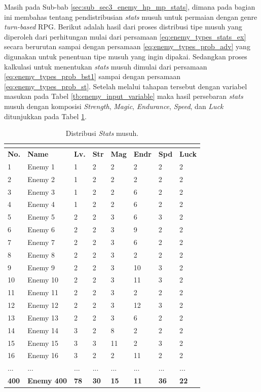 Masih pada Sub-bab \ref{sec:sub_sec3_enemy_hp_mp_stats}, dimana pada bagian ini membahas tentang pendistribusian \textit{stats} musuh untuk permaian dengan genre \textit{turn-based} RPG. Berikut adalah hasil dari proses distribusi tipe musuh yang diperoleh dari perhitungan mulai dari persamaan \ref{eq:enemy_types_stats_ex} secara berurutan sampai dengan persamaan \ref{eq:enemy_types_prob_adv} yang digunakan untuk penentuan tipe musuh yang ingin dipakai. Sedangkan proses kalkulasi untuk menentukan \textit{stats} musuh dimulai dari persamaan \ref{eq:enemy_types_prob_bst1} sampai dengan persamaan \ref{eq:enemy_types_prob_st}. Setelah melalui tahapan tersebut dengan variabel masukan pada Tabel \ref{tb:enemy_input_variable} maka hasil persebaran \textit{stats} musuh dengan komposisi \textit{Strength}, \textit{Magic}, \textit{Endurance}, \textit{Speed}, dan \textit{Luck} ditunjukkan pada Tabel \ref{tb:enemy_stats}.
\vspace{-1ex}

\begin{longtable}{|l|l|l|l|l|l|l|l|}
	\caption{Distribusi \textit{Stats} musuh.}
	\vspace{1ex}
	\label{tb:enemy_stats}\\
	\hline
	\rowcolor[HTML]{C0C0C0} 
	\textbf{No.} & \textbf{Name} & \textbf{Lv.} & \textbf{Str} & \textbf{Mag} & \textbf{Endr} & \textbf{Spd} & \textbf{Luck} \\ \hline
	1 & Enemy 1 & 1 & 2 & 2 & 2 & 2 & 2 \\ \hline
	2 & Enemy 2 & 1 & 2 & 2 & 2 & 2 & 2 \\ \hline
	3 & Enemy 3 & 1 & 2 & 2 & 6 & 2 & 2 \\ \hline
	4 & Enemy 4 & 1 & 2 & 2 & 6 & 2 & 2 \\ \hline
	5 & Enemy 5 & 2 & 2 & 3 & 6 & 3 & 2 \\ \hline
	6 & Enemy 6 & 2 & 2 & 3 & 9 & 2 & 2 \\ \hline
	7 & Enemy 7 & 2 & 2 & 3 & 6 & 2 & 2 \\ \hline
	8 & Enemy 8 & 2 & 2 & 3 & 2 & 2 & 2 \\ \hline
	9 & Enemy 9 & 2 & 2 & 3 & 10 & 3 & 2 \\ \hline
	10 & Enemy 10 & 2 & 2 & 3 & 11 & 3 & 2 \\ \hline
	11 & Enemy 11 & 2 & 2 & 3 & 2 & 2 & 2 \\ \hline
	12 & Enemy 12 & 2 & 2 & 3 & 12 & 3 & 2 \\ \hline
	13 & Enemy 13 & 2 & 2 & 3 & 6 & 2 & 2 \\ \hline
	14 & Enemy 14 & 3 & 2 & 8 & 2 & 2 & 2 \\ \hline
	15 & Enemy 15 & 3 & 3 & 11 & 2 & 3 & 2 \\ \hline
	16 & Enemy 16 & 3 & 2 & 2 & 11 & 2 & 2 \\ \hline
	... & ... & ... & ... & ... & ... & ... & ... \\ \hline
	\textbf{400} & \textbf{Enemy 400} & \textbf{78} & \textbf{30} & \textbf{15} & \textbf{11} & \textbf{36} & \textbf{22} \\ \hline
\end{longtable}
\vspace{1ex}

